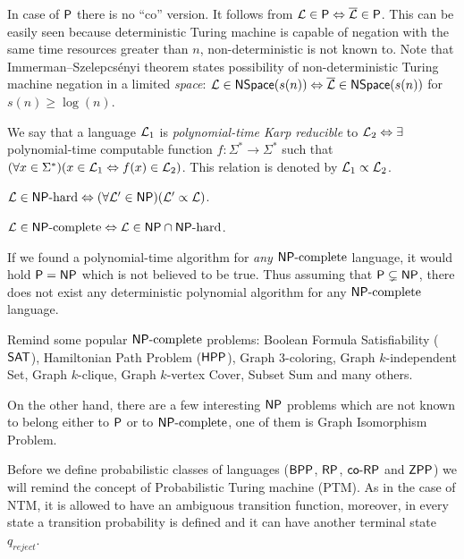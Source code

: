		\begin{remark}
			In case of $\P$ there is no ``co'' version. It follows from ${\cal L} \in \P \iff \overline{\cal L} \in \P$. This can be easily seen because deterministic Turing machine is capable of negation with the same time resources greater than $n$, non-deterministic is not known to. Note that Immerman--Szelepcsényi theorem states possibility of non-deterministic Turing machine negation in a limited {\em space}: ${\cal L} \in \NSpace(s(n)) \iff \overline{\cal L} \in \NSpace(s(n))$ for $s(n) \geq \log(n)$.
		\end{remark}
		
		\begin{defn}
			We say that a language ${\cal L}_1$ is {\em polynomial-time Karp reducible} to ${\cal L}_2 \iff \exists$ polynomial-time computable function $f:\Sigma^*\rightarrow\Sigma^*$ such that $(\forall x\in\Sigma^*)(x\in{\cal L}_1\iff f(x)\in{\cal L}_2)$. This relation is denoted by ${\cal L}_1\propto{\cal L}_2$.
		\end{defn}
		
		\begin{defn}
			${\cal L}\in\NPH \iff (\forall{\cal L'}\in\NP)({\cal L'}\propto{\cal L})$.
		\end{defn}
		
		\begin{defn}
			${\cal L}\in\NPC\iff{\cal L}\in\NP\cap\NPH$.
		\end{defn}
		
		\begin{note}
			If we found a polynomial-time algorithm for {\em any} $\NPC$ language, it would hold $\P=\NP$ which is not believed to be true. Thus assuming that $\P\subsetneq\NP$, there does not exist any deterministic polynomial algorithm for any $\NPC$ language.
		\end{note}
		
		\begin{example}\label{exm:npc}
			Remind some popular $\NPC$ problems: Boolean Formula Satisfiability ($\sf SAT$), Hamiltonian Path Problem ($\sf HPP$), Graph $3$-coloring, Graph $k$-independent Set, Graph $k$-clique, Graph $k$-vertex Cover, Subset Sum and many others.
			
			On the other hand, there are a few interesting $\NP$ problems which are not known to belong either to $\P$ or to $\NPC$, one of them is Graph Isomorphism Problem.
		\end{example}
		
		Before we define probabilistic classes of languages ($\BPP$, $\RP$, $\coRP$ and $\ZPP$) we will remind the concept of Probabilistic Turing machine (PTM). As in the case of NTM, it is allowed to have an ambiguous transition function, moreover, in every state a transition probability is defined and it can have another terminal state $q_{reject}$.
		
